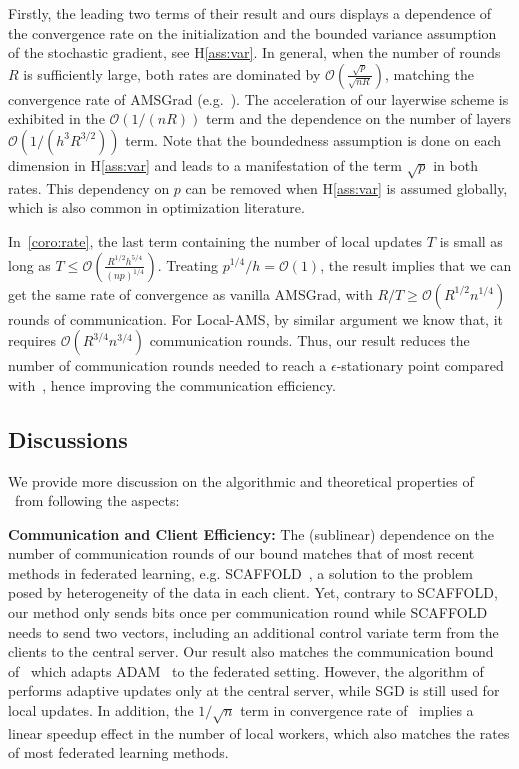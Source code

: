 \documentclass[twoside]{article}
\begin{document}
Firstly, the leading two terms of their result and ours displays a dependence of the convergence rate on the initialization and the bounded variance assumption of the stochastic gradient, see H\ref{ass:var}. In general, when the number of rounds $R$ is sufficiently large, both rates are dominated by $\mathcal O(\frac{\sqrt p}{\sqrt{n R}})$, matching the convergence rate of AMSGrad (e.g.~\cite{Arxiv:Zhou_18}).
The acceleration of our layerwise scheme is exhibited in the $\mathcal O(1/(n R))$ term and the dependence on the number of layers $\mathcal O(1/(h^3 R^{3/2}))$ term. Note that the boundedness assumption is done on each dimension in H\ref{ass:var} and leads to a manifestation of the term $\sqrt{p}$ in both rates. This dependency on $p$ can be removed when H\ref{ass:var} is assumed globally, which is also common in optimization literature.

In~\eqref{coro:rate}, the last term containing the number of local updates $T$ is small as long as $T\leq \mathcal O(\frac{R^{1/2}h^{5/4}}{(np)^{1/4}})$. 
Treating $p^{1/4}/h=\mathcal O(1)$, the result implies that we can get the same rate of convergence as vanilla AMSGrad, with $R/T\geq \mathcal{O}(R^{1/2}n^{1/4})$ rounds of communication. For Local-AMS, by similar argument we know that, it requires $\mathcal O(R^{3/4}n^{3/4})$ communication rounds. Thus, our result reduces the number of communication rounds needed to reach a $\epsilon$-stationary point compared with~\cite{chen2020toward}, hence improving the communication efficiency.


\subsection{Discussions}

We provide more discussion on the algorithmic and theoretical properties of \algo\ from following the aspects:

\medskip
\textbf{Communication and Client Efficiency:} The (sublinear) dependence on the number of communication rounds of our bound matches that of most recent methods in federated learning, e.g. SCAFFOLD~\citet{karimireddy2019scaffold}, a solution to the problem posed by heterogeneity of the data in each client. Yet, contrary to SCAFFOLD, our method only sends bits once per communication round while SCAFFOLD needs to send two vectors, including an additional control variate term  from the clients to the central server. Our result also matches the communication bound of~\cite{reddi2020adaptive} which adapts ADAM~\cite{KB15} to the federated setting. However, the algorithm of \cite{reddi2020adaptive} performs adaptive updates only at the central server, while SGD is still used for local updates. In addition, the $1/\sqrt n$ term in convergence rate of \algo\ implies a linear speedup effect in the number of local workers, which also matches the rates of most federated learning methods. 
\end{document}

